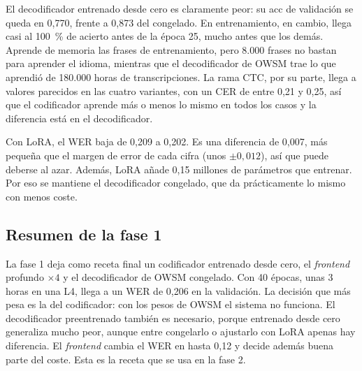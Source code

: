 El decodificador entrenado desde cero es claramente peor: su acc de validación se queda en 0,770, frente a 0,873 del congelado. En entrenamiento, en cambio, llega casi al 100~\% de acierto antes de la época 25, mucho antes que los demás. Aprende de memoria las frases de entrenamiento, pero 8.000 frases no bastan para aprender el idioma, mientras que el decodificador de OWSM trae lo que aprendió de 180.000 horas de transcripciones. La rama CTC, por su parte, llega a valores parecidos en las cuatro variantes, con un CER de entre 0,21 y 0,25, así que el codificador aprende más o menos lo mismo en todos los casos y la diferencia está en el decodificador.

Con LoRA, el WER baja de 0,209 a 0,202. Es una diferencia de 0,007, más pequeña que el margen de error de cada cifra (unos $\pm 0{,}012$), así que puede deberse al azar. Además, LoRA añade 0,15 millones de parámetros que entrenar. Por eso se mantiene el decodificador congelado, que da prácticamente lo mismo con menos coste.


\subsection{Resumen de la fase 1}
\label{sec:res-resumen-fase1}

La fase 1 deja como receta final un codificador entrenado desde cero, el \textit{frontend} profundo $\times 4$ y el decodificador de OWSM congelado. Con 40 épocas, unas 3 horas en una L4, llega a un WER de 0,206 en la validación. La decisión que más pesa es la del codificador: con los pesos de OWSM el sistema no funciona. El decodificador preentrenado también es necesario, porque entrenado desde cero generaliza mucho peor, aunque entre congelarlo o ajustarlo con LoRA apenas hay diferencia. El \textit{frontend} cambia el WER en hasta 0,12 y decide además buena parte del coste. Esta es la receta que se usa en la fase 2.

